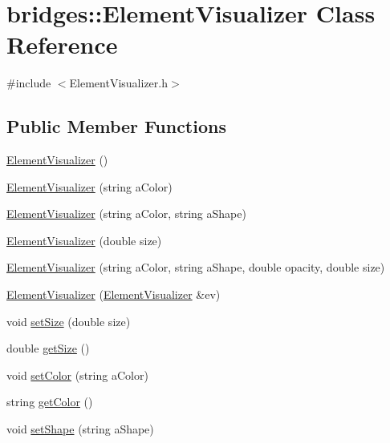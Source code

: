 \hypertarget{classbridges_1_1_element_visualizer}{}\section{bridges\+:\+:Element\+Visualizer Class Reference}
\label{classbridges_1_1_element_visualizer}


{\ttfamily \#include $<$Element\+Visualizer.\+h$>$}

\subsection*{Public Member Functions}
\begin{DoxyCompactItemize}
\item 
\hyperlink{classbridges_1_1_element_visualizer_a86b6777b9876af6ae828fa121c2fc73e}{Element\+Visualizer} ()
\item 
\hyperlink{classbridges_1_1_element_visualizer_a1717e4bcda460daf907b59a5c17ed5df}{Element\+Visualizer} (string a\+Color)
\item 
\hyperlink{classbridges_1_1_element_visualizer_a175552169fe2dc9343409ccaedc00495}{Element\+Visualizer} (string a\+Color, string a\+Shape)
\item 
\hyperlink{classbridges_1_1_element_visualizer_a6734ec0c1f57982bffbc89e83e4ef9ae}{Element\+Visualizer} (double size)
\item 
\hyperlink{classbridges_1_1_element_visualizer_a698d793a056d4be4ec3681f26d1cb8d9}{Element\+Visualizer} (string a\+Color, string a\+Shape, double opacity, double size)
\item 
\hyperlink{classbridges_1_1_element_visualizer_a8bfb9b2c3749fe435d7d22fe62839243}{Element\+Visualizer} (\hyperlink{classbridges_1_1_element_visualizer}{Element\+Visualizer} \&ev)
\item 
void \hyperlink{classbridges_1_1_element_visualizer_a23889f9093c03ca79a9509312f68d7df}{set\+Size} (double size)
\item 
double \hyperlink{classbridges_1_1_element_visualizer_a00b71f8c783eec23124e925c591b85c0}{get\+Size} ()
\item 
void \hyperlink{classbridges_1_1_element_visualizer_a3ffb0a08204bb86acee0e581c2021c07}{set\+Color} (string a\+Color)
\item 
string \hyperlink{classbridges_1_1_element_visualizer_af33ea5c9fb989673618f90f4059e7e3f}{get\+Color} ()
\item 
void \hyperlink{classbridges_1_1_element_visualizer_a0b40cd56ebfa866cca626b58d172f102}{set\+Shape} (string a\+Shape)

\end{DoxyCompactItemize}
